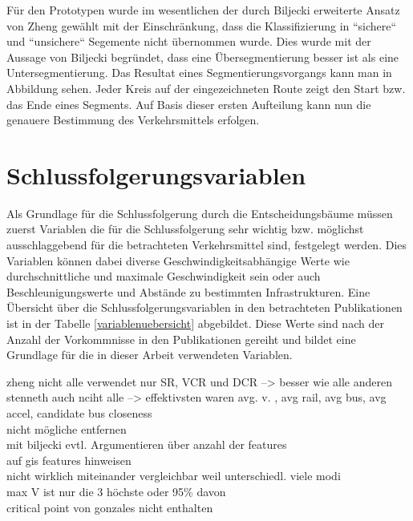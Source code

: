 Für den Prototypen wurde im wesentlichen der durch Biljecki erweiterte Ansatz von Zheng gewählt mit der Einschränkung, dass die Klassifizierung in ``sichere`` und ``unsichere`` Segemente nicht übernommen wurde. Dies wurde mit der Aussage von Biljecki begründet, dass eine Übersegmentierung besser ist als eine Untersegmentierung. Das Resultat eines Segmentierungsvorgangs kann man in Abbildung  sehen. Jeder Kreis auf der eingezeichneten Route zeigt den Start bzw. das Ende eines Segments. Auf Basis dieser ersten Aufteilung kann nun die genauere Bestimmung des Verkehrsmittels erfolgen.

\clearpage

\section{Schlussfolgerungsvariablen}
Als Grundlage für die Schlussfolgerung durch die Entscheidungsbäume müssen zuerst Variablen die für die Schlussfolgerung sehr wichtig bzw. möglichst ausschlaggebend für die betrachteten Verkehrsmittel sind, festgelegt werden. Dies Variablen können dabei diverse Geschwindigkeitsabhängige Werte wie durchschnittliche und maximale Geschwindigkeit sein oder auch Beschleunigungswerte und  Abstände zu bestimmten Infrastrukturen. Eine Übersicht über die Schlussfolgerungsvariablen in den betrachteten Publikationen ist in der Tabelle \ref{variablenuebersicht} abgebildet. Diese Werte sind nach der Anzahl der Vorkommnisse in den Publikationen gereiht und bildet eine Grundlage für die in dieser Arbeit verwendeten Variablen.

zheng nicht alle verwendet nur SR, VCR und DCR --> besser wie alle anderen\\ 
stenneth auch nciht alle --> effektivsten waren avg. v. , avg rail, avg bus, avg accel, candidate bus closeness\\


nicht mögliche entfernen \\
mit biljecki evtl. Argumentieren über anzahl der features \\
auf gis features hinweisen \\
nicht wirklich miteinander vergleichbar weil unterschiedl. viele modi \\
max V ist nur die 3 höchste oder 95\% davon \\
critical point von gonzales nicht enthalten \\

